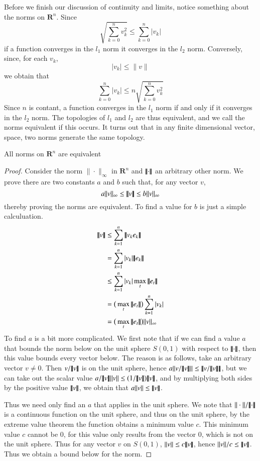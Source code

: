 Before we finish our discussion of continuity and limits, notice something about the norms on $\mathbf{R}^n$. Since
%
\[ \sqrt{\sum_{k = 0}^n v_k^2} \leq \sum_{k = 0}^n |v_k| \]
%
if a function converges in the $l_1$ norm it converges in the $l_2$ norm. Conversely, since, for each $v_k$,
%
\[ |v_k| \leq \|v\| \]
%
we obtain that
%
\[ \sum_{k = 0}^n |v_k| \leq n \sqrt{\sum_{k = 0}^n v_k^2} \]
%
Since $n$ is contant, a function converges in the $l_1$ norm if and only if it converges in the $l_2$ norm. The topologies of $l_1$ and $l_2$ are thus equivalent, and we call the norms equivalent if this occurs. It turns out that in any finite dimensional vector, space, two norms generate the same topology.

\begin{theorem}All norms on $\mathbf{R}^n$ are equivalent\end{theorem}
\begin{proof}
  Consider the norm $\| \cdot \|_{\infty}$ in $\mathbf{R}^n$ and $\tripnorm{ \cdot }$ an arbitrary other norm. We prove there are two constants $a$ and $b$ such that, for any vector $v$,
  \[ a\|v\|_{\infty} \leq \tripnorm{v} \leq b\|v\|_{\infty} \]
  thereby proving the norms are equivalent. To find a value for $b$ is just a simple calculuation.
  \begin{align*}
    \tripnorm{v} &\leq \sum_{k = 1}^n \tripnorm{v_ke_k}\\
                 &= \sum_{k = 1}^n |v_k| \tripnorm{e_k}\\
                 &\leq \sum_{k = 1}^n |v_k| \max_{t} \tripnorm{e_t}\\
                 &= \big( \max_{t} \tripnorm{e_t} \big) \sum_{k = 1}^n |v_k|\\
                 &= \big ( \max_{t} \tripnorm{e_t} \big) \| v \|_{\infty}
  \end{align*}
  To find $a$ is a bit more complicated. We first note that if we can find a value $a$ that bounds the norm below on the unit sphere $S(0,1)$ with respect to $\tripnorm{\cdot}$, then this value bounds every vector below. The reason is as follows, take an arbitrary vector $v \neq 0$. Then $v/\tripnorm{v}$ is on the unit sphere, hence $a\|v/\tripnorm{v}\| \leq \tripnorm{v/\tripnorm{v}}$, but we can take out the scalar value $a/\tripnorm{v} \|v\| \leq (1/\tripnorm{v}) \tripnorm{v}$, and by multiplying both sides by the positive value $\tripnorm{v}$, we obtain that $a \| v \| \leq \tripnorm{v}$.

  Thus we need only find an $a$ that applies in the unit sphere. We note that $\| \cdot \|/\tripnorm{\cdot}$ is a continuous function on the unit sphere, and thus on the unit sphere, by the extreme value theorem the function obtains a minimum value $c$. This minimum value $c$ cannot be 0, for this value only results from the vector $0$, which is not on the unit sphere. Thus for any vector $v$ on $S(0,1)$, $\| v \| \leq c \tripnorm{v} $, hence $\| v \| / c \leq \tripnorm{v}$. Thus we obtain a bound below for the norm.
\end{proof}

